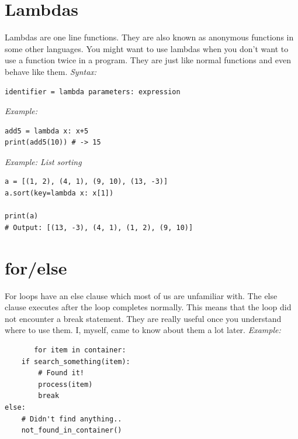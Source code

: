 \documentclass{report}
\begin{document}
    \pagebreak \bigbreak \noindent \section{Lambdas}
    \bigbreak \noindent 
    Lambdas are one line functions. They are also known as anonymous functions in some other languages. You might want to use lambdas when you don’t want to use a function twice in a program. They are just like normal functions and even behave like them.
    \bigbreak \noindent 
    \textit{Syntax:}
    \bigbreak \noindent 
    \begin{verbatim}
identifier = lambda parameters: expression
    \end{verbatim}
    \bigbreak \noindent 
    \textit{Example:}
    \begin{mdframed}
        \begin{verbatim}
add5 = lambda x: x+5
print(add5(10)) # -> 15
        \end{verbatim}
    \end{mdframed}
    \bigbreak \noindent 
    \textit{Example: List sorting}
    \bigbreak \noindent 
    \begin{mdframed}
    \begin{verbatim}
a = [(1, 2), (4, 1), (9, 10), (13, -3)]
a.sort(key=lambda x: x[1])

print(a)
# Output: [(13, -3), (4, 1), (1, 2), (9, 10)] 
        \end{verbatim}
    \end{mdframed}



    \bigbreak\noindent
    \pagebreak \bigbreak \noindent \section{for/else}
    For loops have an else clause which most of us are unfamiliar with. The else clause executes after the loop completes normally. This means that the loop did not encounter a break statement. They are really useful once you understand where to use them. I, myself, came to know about them a lot later.
    \bigbreak \noindent 
    \textit{Example:}
    \begin{mdframed}
       \begin{verbatim}
       for item in container:
    if search_something(item):
        # Found it!
        process(item)
        break
else:
    # Didn't find anything..
    not_found_in_container()
       \end{verbatim} 
    \end{mdframed}
\end{document}
